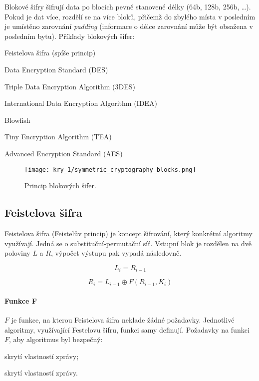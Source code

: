 Blokové šifry šifrují data po blocích pevně stanovené délky (64b, 128b, 256b, \dots). Pokud je dat více, rozdělí se na více bloků, přičemž do zbylého místa v posledním je umístěno zarovnání \textit{padding} (informace o délce zarovnání může být obsažena v posledním bytu). Příklady blokových šifer: \begin{compactitem}
    \item Feistelova šifra (spíše princip)
    \item Data Encryption Standard (DES)
    \item Triple Data Encryption Algorithm (3DES)
    \item International Data Encryption Algorithm (IDEA)
    \item Blowfish
    \item Tiny Encryption Algorithm (TEA)
    \item Advanced Encryption Standard (AES)
\end{compactitem}

\begin{figure}[H]
    \centering
    \texttt{[image: kry\_1/symmetric\_cryptography\_blocks.png]}
    \caption{Princip blokových šifer.}
\end{figure}

\subsection*{Feistelova šifra}

Feistelova šifra (Feistelův princip) je koncept šifrování, který konkrétní algoritmy využívají. Jedná se o substituční-permutační síť. Vstupní blok je rozdělen na dvě poloviny $L$ a $R$, výpočet výstupu pak vypadá následovně.

\begin{equation}
    L_i = R_{i-1}
\end{equation}

\begin{equation}
    R_i = L_{i-1} \oplus F(R_{i-1}, K_i)
\end{equation}

\paragraph*{Funkce F} $F$ je funkce, na kterou Feistelova šifra neklade žádné požadavky. Jednotlivé algoritmy, využívající Festelovu šifru, funkci samy definují. Požadavky na funkci $F$, aby algoritmus byl bezpečný: \begin{compactitem}
    \item skrytí vlastností zprávy;
    \item skrytí vlastností zprávy.
\end{compactitem}

